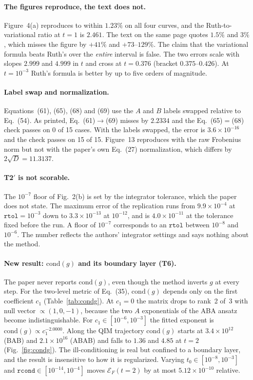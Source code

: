 \documentclass[aps,pra,reprint,superscriptaddress,nofootinbib]{revtex4-2}
\newcommand{\cond}{\mathrm{cond}}
\newcommand{\rcond}{\texttt{rcond}}
\begin{document}
\paragraph*{The figures reproduce, the text does not.} Figure~4(a) reproduces to within
$1.23\%$ on all four curves, and the Ruth-to-variational ratio at $t=1$ is $2.461$. The text on
the same page quotes $1.5\%$ and $3\%$, which misses the figure by $+41\%$ and $+73$--$129\%$.
The claim that the variational formula beats Ruth's over the \emph{entire} interval is false.
The two errors scale with slopes $2.999$ and $4.999$ in $t$ and cross at $t=0.376$ (bracket
$0.375$--$0.426$). At $t=10^{-3}$ Ruth's formula is better by up to five orders of magnitude.

\paragraph*{Label swap and normalization.} Equations~(61), (65), (68) and (69) use the $A$
and $B$ labels swapped relative to Eq.~(54). As printed, Eq.~(61)$\to$(69) misses by $2.2334$
and the Eq.~(65)$=$(68) check passes on 0 of 15 cases. With the labels swapped, the error is
$3.6\times10^{-16}$ and the check passes on 15 of 15. Figure~13 reproduces with the raw
Frobenius norm but not with the paper's own Eq.~(27) normalization, which differs by
$2\sqrt D=11.3137$.

\paragraph*{T2$'$ is not scorable.} The $10^{-7}$ floor of Fig.~2(b) is set by the integrator
tolerance, which the paper does not state. The maximum error of the replication runs from $9.9\times10^{-4}$ at
$\texttt{rtol}=10^{-3}$ down to $3.3\times10^{-13}$ at $10^{-12}$, and is $4.0\times10^{-11}$ at
the tolerance fixed before the run. A floor of $10^{-7}$ corresponds to an
$\texttt{rtol}$ between $10^{-8}$ and $10^{-6}$. The number reflects the authors' integrator
settings and says nothing about the method.

\paragraph*{New result: $\cond(g)$ and its boundary layer (T6).} The paper never reports
$\cond(g)$, even though the method inverts $g$ at every step. For the two-level metric of
Eq.~(35), $\cond(g)$ depends only on the first coefficient $c_1$ (Table~\ref{tab:condg}). At
$c_1=0$ the matrix drops to rank~2 of~3 with null vector $\propto(1,0,-1)$, because the two
$A$ exponentials of the ABA ansatz become indistinguishable. For $c_1\in[10^{-6},10^{-3}]$ the
fitted exponent is $\cond(g)\propto c_1^{-2.0000}$. Along the QIM trajectory $\cond(g)$ starts
at $3.4\times10^{12}$ (BAB) and $2.1\times10^{16}$ (ABAB) and falls to $1.36$ and $4.85$ at $t=2$
(Fig.~\ref{fig:condg}). The ill-conditioning is real but confined to a boundary layer, and
the result is insensitive to how it is regularized. Varying $t_0\in[10^{-8},10^{-3}]$ and
$\rcond\in[10^{-14},10^{-4}]$ moves $\mathcal E_F(t{=}2)$ by at most $5.12\times10^{-10}$
relative.
\end{document}
